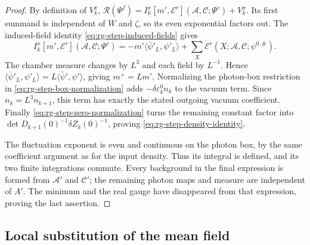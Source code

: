 \begin{proof}
By definition of $V_k^x$,
$\mathcal R(\Psi^f)=
I_k^x[m',\mathscr E^r](\mathscr A,\mathscr C;\Psi^c)+V_k^x$.
Its first summand is independent of $W$ and $\zeta$,
so its even exponential factors out.
The induced-field identity
\eqref{eq:rg-step-induced-fields} gives
\[
 I_k^x[m',\mathscr E^r](\mathscr A,\mathscr C;\Psi^c)
      =-m'\langle\bar\psi'_L,\psi'_L\rangle
                 +\sum_X\mathscr E^r(X;\mathscr A,\mathscr C;\psi^{0,\#}).
\]
The chamber measure changes by $L^3$ and each field
by $L^{-1}$. Hence
$\langle\bar\psi'_L,\psi'_L\rangle
=L\langle\bar\psi',\psi'\rangle$, giving $m^+=Lm'$.
Normalizing the photon-box restriction in
\eqref{eq:rg-step-box-normalization} adds
$-\delta\varepsilon_k^0 n_k$ to the vacuum term.
Since $n_k=L^3n_{k+1}$, this term has exactly
the stated outgoing vacuum coefficient.
Finally \eqref{eq:rg-step-zero-normalization}
turns the remaining constant factor into
$\det D_{k+1}(0)^{-1}\delta Z_k(0)^{-1}$,
proving \eqref{eq:rg-step-density-identity}.

The fluctuation exponent is even and continuous
on the photon box, by the same coefficient argument
as for the input density. Thus its integral is defined,
and its two finite integrations commute.
Every background in the final expression is formed
from $\mathscr A'$ and $\mathscr C'$; the remaining
photon maps and measure are independent of $A'$.
The minimum and the real gauge have disappeared
from that expression, proving the last assertion.
\end{proof}

\subsection{Local substitution of the mean field}
\label{subsec:rg-step-local-substitution}

